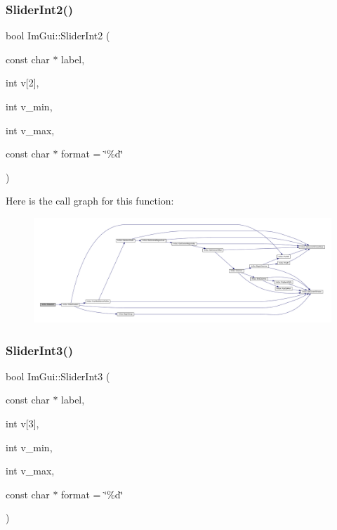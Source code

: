 \subsubsection{\texorpdfstring{Slider\+Int2()}{SliderInt2()}}
{\footnotesize\ttfamily bool Im\+Gui\+::\+Slider\+Int2 (\begin{DoxyParamCaption}\item[{const char $\ast$}]{label,  }\item[{int}]{v\mbox{[}2\mbox{]},  }\item[{int}]{v\+\_\+min,  }\item[{int}]{v\+\_\+max,  }\item[{const char $\ast$}]{format = {\ttfamily \char`\"{}\%d\char`\"{}} }\end{DoxyParamCaption})}

Here is the call graph for this function\+:
\nopagebreak
\begin{figure}[H]
\begin{center}
\leavevmode
\includegraphics[width=350pt]{namespace_im_gui_a4d65e19b43b2f70d22e47cac3130cddd_cgraph}
\end{center}
\end{figure}
\mbox{\label{namespace_im_gui_a36ecf351f979f7c2c5498846c0cf0b12}} 
\subsubsection{\texorpdfstring{Slider\+Int3()}{SliderInt3()}}
{\footnotesize\ttfamily bool Im\+Gui\+::\+Slider\+Int3 (\begin{DoxyParamCaption}\item[{const char $\ast$}]{label,  }\item[{int}]{v\mbox{[}3\mbox{]},  }\item[{int}]{v\+\_\+min,  }\item[{int}]{v\+\_\+max,  }\item[{const char $\ast$}]{format = {\ttfamily \char`\"{}\%d\char`\"{}} }\end{DoxyParamCaption})}

